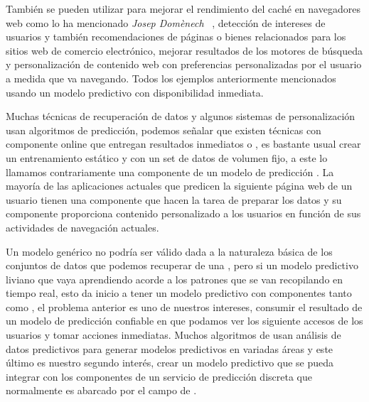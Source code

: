 


También se pueden utilizar para mejorar el rendimiento del caché en navegadores web como lo ha mencionado \emph{Josep Domènech} \etal~\cite{Domenech2006},  detección de intereses de usuarios y también recomendaciones de páginas o bienes relacionados para los sitios {web} de comercio electrónico, mejorar  resultados de los motores de búsqueda y personalización de contenido web con preferencias personalizadas por el usuario a medida que va navegando. Todos los ejemplos anteriormente mencionados usando un modelo predictivo con disponibilidad inmediata.





Muchas técnicas de recuperación de datos y algunos sistemas de personalización usan algoritmos de predicción, podemos señalar que existen técnicas con componente online que entregan resultados inmediatos o \online, es bastante usual crear un entrenamiento estático y con un set de datos de volumen fijo, a este lo llamamos contrariamente una componente \offline de un modelo de predicción . La mayoría de las aplicaciones actuales que predicen la siguiente página web de un usuario tienen una componente  \offline que hacen la tarea de preparar los datos y su componente \online  proporciona contenido personalizado a los usuarios en función de sus actividades de navegación actuales.

Un modelo genérico no podría ser válido dada a la naturaleza básica de los conjuntos de datos que podemos recuperar de una \web, pero si un modelo predictivo liviano que vaya aprendiendo acorde a los patrones que se van recopilando en tiempo real, esto da inicio a tener un modelo predictivo con componentes tanto \online como \offline, el problema anterior es uno de nuestros intereses, consumir el resultado de un modelo de predicción confiable en que podamos ver los siguiente accesos de los usuarios y tomar acciones inmediatas. Muchos algoritmos de \machinelearning usan análisis de datos predictivos para generar modelos predictivos en variadas áreas y este último es nuestro segundo interés, crear un modelo predictivo que se pueda integrar con los componentes de un servicio de predicción discreta que normalmente es abarcado por el campo de \machinelearning.  




